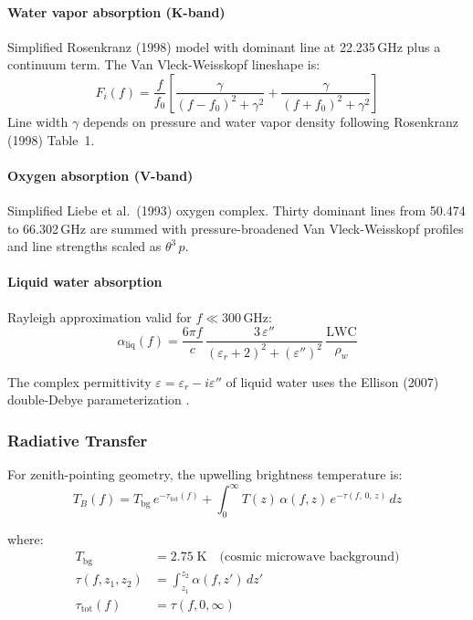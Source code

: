 \documentclass[11pt,letterpaper]{article}
\begin{document}
\paragraph{Water vapor absorption (K-band)}
Simplified Rosenkranz (1998) model \cite{Rosenkranz1998} with dominant line at 22.235\,GHz
plus a continuum term.  The Van Vleck-Weisskopf lineshape is:
\begin{equation}
  F_i(f) = \frac{f}{f_0}\left[\frac{\gamma}{(f-f_0)^2+\gamma^2}
                               + \frac{\gamma}{(f+f_0)^2+\gamma^2}\right]
\end{equation}
Line width $\gamma$ depends on pressure and water vapor density following
Rosenkranz (1998) Table~1.

\paragraph{Oxygen absorption (V-band)}
Simplified Liebe et al.\ (1993) \cite{Liebe1993} oxygen complex.
Thirty dominant lines from 50.474 to 66.302\,GHz are summed with pressure-broadened
Van Vleck-Weisskopf profiles and line strengths scaled as $\theta^3\,p$.

\paragraph{Liquid water absorption}
Rayleigh approximation valid for $f \ll 300$\,GHz:
\begin{equation}
  \alpha_\mathrm{liq}(f) = \frac{6\pi f}{c}\,
  \frac{3\,\varepsilon''}{(\varepsilon_r + 2)^2 + (\varepsilon'')^2}\,
  \frac{\mathrm{LWC}}{\rho_w}
  \label{eq:alpha_liq}
\end{equation}

\noindent The complex permittivity $\varepsilon = \varepsilon_r - i\varepsilon''$ of liquid water
uses the Ellison (2007) double-Debye parameterization \cite{Ellison2007}.

\subsubsection{Radiative Transfer}

For zenith-pointing geometry, the upwelling brightness temperature is:
\begin{equation}
  \boxed{T_B(f) = T_\mathrm{bg}\,e^{-\tau_\mathrm{tot}(f)}
  + \int_0^\infty T(z)\,\alpha(f,z)\,
  e^{-\tau(f,\,0,\,z)}\,dz}
  \label{eq:RT}
\end{equation}

\noindent where:
\begin{align*}
  T_\mathrm{bg} &= 2.75\;\mathrm{K} \quad\text{(cosmic microwave background)} \\
  \tau(f, z_1, z_2) &= \int_{z_1}^{z_2}\alpha(f,z')\,dz' \\
  \tau_\mathrm{tot}(f) &= \tau(f, 0, \infty)
\end{align*}
\end{document}
